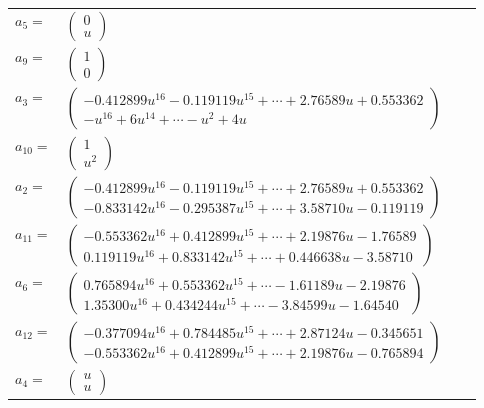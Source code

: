 \documentclass[1p]{elsarticle_modified}
\theoremstyle{definition}
\begin{document}
\begin{tabular}{m{7pt} m{180pt} m{7pt} m{180pt} }
\flushright $a_{5}=$&$\begin{pmatrix}0\\u\end{pmatrix}$ \\
\flushright $a_{9}=$&$\begin{pmatrix}1\\0\end{pmatrix}$ \\
\flushright $a_{3}=$&$\begin{pmatrix}-0.412899 u^{16}-0.119119 u^{15}+\cdots+2.76589 u+0.553362\\- u^{16}+6 u^{14}+\cdots- u^2+4 u\end{pmatrix}$ \\
\flushright $a_{10}=$&$\begin{pmatrix}1\\u^2\end{pmatrix}$ \\
\flushright $a_{2}=$&$\begin{pmatrix}-0.412899 u^{16}-0.119119 u^{15}+\cdots+2.76589 u+0.553362\\-0.833142 u^{16}-0.295387 u^{15}+\cdots+3.58710 u-0.119119\end{pmatrix}$ \\
\flushright $a_{11}=$&$\begin{pmatrix}-0.553362 u^{16}+0.412899 u^{15}+\cdots+2.19876 u-1.76589\\0.119119 u^{16}+0.833142 u^{15}+\cdots+0.446638 u-3.58710\end{pmatrix}$ \\
\flushright $a_{6}=$&$\begin{pmatrix}0.765894 u^{16}+0.553362 u^{15}+\cdots-1.61189 u-2.19876\\1.35300 u^{16}+0.434244 u^{15}+\cdots-3.84599 u-1.64540\end{pmatrix}$ \\
\flushright $a_{12}=$&$\begin{pmatrix}-0.377094 u^{16}+0.784485 u^{15}+\cdots+2.87124 u-0.345651\\-0.553362 u^{16}+0.412899 u^{15}+\cdots+2.19876 u-0.765894\end{pmatrix}$ \\
\flushright $a_{4}=$&$\begin{pmatrix}u\\u\end{pmatrix}$ \\

\end{tabular}
\end{document}
